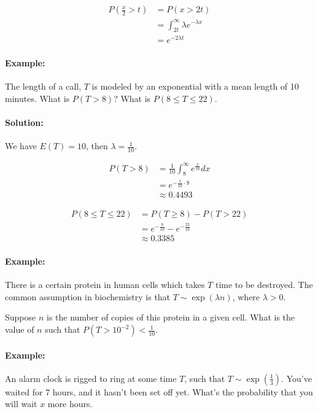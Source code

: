 \documentclass[letterpaper,12pt]{article}
\begin{document}
\begin{align*}
    P(\frac{x}{2} > t) &= P(x > 2t) \\
                       &= \int_{2t}^{\infty} \lambda e ^{-\lambda x}\\
                       &= e^{-2\lambda t}
\end{align*}

\paragraph{Example:} The length of a call, $T$  is modeled by an exponential with a mean length of
10 minutes. What is $P(T > 8)$? What is $P(8 \le T \le 22)$.

\paragraph{Solution:}


We have $E(T) = 10$, then $\lambda = \frac{1}{10}$.


\begin{align*}
    P(T > 8) &= \frac{1}{10} \int_8^{\infty} e^{\frac{x}{10}}dx \\
             &= e^{-\frac{1}{10}\cdot 8}\\
             &\approx 0.4493
\end{align*}

\begin{align*}
    P(8 \le T \le 22) &= P(T \ge 8) - P(T > 22)\\
                      &= e^{-\frac{8}{10}} - e^{-\frac{22}{10}}\\
                      &\approx 0.3385
\end{align*}

\paragraph{Example:} There is a certain protein in human cells which takes $T$ time to be destroyed.
The common assumption in biochemistry is that $T \sim \exp (\lambda n)$, where $\lambda > 0$.


Suppose $n$ is the number of copies of this protein in a given cell. What is the value of $n$ such that
$P(T > 10^{-2}) < \frac{1}{10}$.

\paragraph{Example:} An alarm clock is rigged to ring at some time $T$, such that $T \sim \exp(\frac{1}{3})$.
You've waited for 7 hours, and it hasn't been set off yet. What's the probability that you will wait
$x$ more hours.
\end{document}
